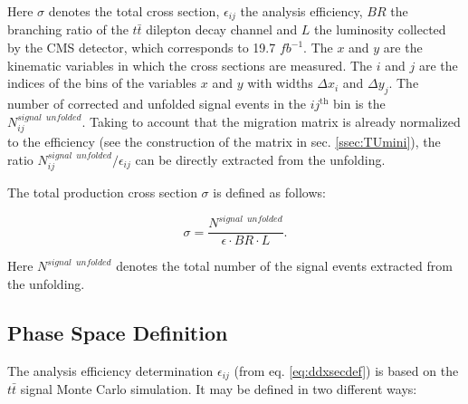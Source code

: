 Here $\sigma$ denotes the total cross section, $\epsilon_{ij}$ the analysis efficiency, $BR$ the branching ratio of the $t\bar{t}$ dilepton decay channel and $L$ the luminosity
collected by the CMS detector, which corresponds to 19.7 $fb^{-1}$. The $x$ and $y$ are the kinematic variables in which the cross sections 
are measured. The $i$ and $j$ are the indices of the bins of the variables $x$ and $y$ with widths $\Delta x_{i}$ and $\Delta y_{j}$.
The number of corrected and unfolded signal events in the $ij^{\textrm{th}}$ bin is the $N^{signal\:\;unfolded}_{ij}$.
Taking to account that the migration matrix is already normalized to the efficiency (see the construction of the matrix in sec. \ref{ssec:TUmini}), 
the ratio $N^{signal\:\;unfolded}_{ij} / \epsilon_{ij}$ can be directly extracted from the unfolding.

The total production cross section $\sigma$ is defined as follows:

\begin{equation}
 \sigma = \frac{N^{signal\;\:unfolded}}{\epsilon \cdot BR \cdot L}.
\end{equation}

Here $N^{signal\;\:unfolded}$ denotes the total number of the signal events extracted from the unfolding. 

\subsection{Phase Space Definition}

The analysis efficiency determination $\epsilon_{ij}$ (from eq. \ref{eq:ddxsecdef}) is based on the $t\bar{t}$ signal Monte Carlo simulation.
It may be defined in two different ways:

